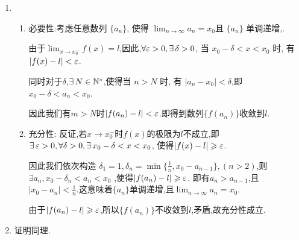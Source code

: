 \begin{solution}
    \begin{enumerate}
        \item \begin{enumerate}
            \item 必要性:考虑任意数列 $\{a_n\}$, 使得 $\lim_{n\to\infty}a_n = x_0$且 $\{a_n\}$ 单调递增,.
            
            由于$\lim_{x \to x_0^-}f(x)=l$,因此,$\forall \ve > 0, \exists \delta > 0$, 当 $x_0 - \delta < x < x_0$ 时, 有 $|f(x) - l| < \varepsilon$.
            
            同时对于$\delta$,$\exists N \in \N^*$,使得当 $n > N$ 时, 有 $|a_n - x_0| < \delta$,即 $x_0 - \delta < a_n < x_0$.

            因此我们有$m>N$时$|f(a_n)-l|<\varepsilon$.即得到数列$\{f(a_n)\}$收敛到$l$.
            \item 充分性: 反证,若$x\to x_0^-$时$f(x)$的极限为$l$不成立,即$\exists \ve > 0, \forall \delta > 0, \exists x_0 - \delta < x < x_0$, 使得$|f(x) - l| \geqslant \varepsilon$.
            
            因此我们依次构造 $\delta_1=1,\delta_n = \min\{\frac{1}{n},x_0-a_{n-1}\},(n>2)$,则$\exists a_n,x_0-\delta_n<a_n<x_0$ ,使得$|f(a_n) - l| \geqslant \varepsilon$.
            即有$a_n>a_{n-1}$,且$|x_0-a_n|<\frac{1}{n}$.这意味着$\{a_n\}$单调递增,且$\lim_{n \to \infty} a_n = x_0$.

            由于$|f(a_n) - l| \geqslant \varepsilon$,所以$\{f(a_n)\}$不收敛到$l$,矛盾,故充分性成立.
        \end{enumerate}
        \item 证明同理.
    \end{enumerate}
\end{solution}

